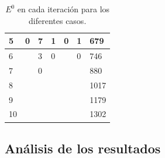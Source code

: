 \begin{table}[!ht]
\begin{tabular}{|lllllll|}
\multicolumn{1}{|l|}{5}                     & \multicolumn{1}{l|}{0}                    & \multicolumn{1}{l|}{7}                       & \multicolumn{1}{l|}{1}                  & \multicolumn{1}{l|}{0}                  & \multicolumn{1}{l|}{1}                    & 679               \\ \hline
\multicolumn{1}{|l|}{6}                     & \multicolumn{1}{l|}{}                     & \multicolumn{1}{l|}{3}                       & \multicolumn{1}{l|}{0}                  & \multicolumn{1}{l|}{}                   & \multicolumn{1}{l|}{0}                    & 746               \\ \hline
\multicolumn{1}{|l|}{7}                     & \multicolumn{1}{l|}{}                     & \multicolumn{1}{l|}{0}                       & \multicolumn{1}{l|}{}                   & \multicolumn{1}{l|}{}                   & \multicolumn{1}{l|}{}                     & 880               \\ \hline
\multicolumn{1}{|l|}{8}                     & \multicolumn{1}{l|}{}                     & \multicolumn{1}{l|}{}                        & \multicolumn{1}{l|}{}                   & \multicolumn{1}{l|}{}                   & \multicolumn{1}{l|}{}                     & 1017              \\ \hline
\multicolumn{1}{|l|}{9}                     & \multicolumn{1}{l|}{}                     & \multicolumn{1}{l|}{}                        & \multicolumn{1}{l|}{}                   & \multicolumn{1}{l|}{}                   & \multicolumn{1}{l|}{}                     & 1179              \\ \hline
\multicolumn{1}{|l|}{10}                    & \multicolumn{1}{l|}{}                     & \multicolumn{1}{l|}{}                        & \multicolumn{1}{l|}{}                   & \multicolumn{1}{l|}{}                   & \multicolumn{1}{l|}{}                     & 1302              \\ \hline
\end{tabular}
\caption{ $E^0$ en cada iteración para los diferentes casos. }
\label{table:num_els_ref}
\end{table}

\subsection{Análisis de los resultados}



